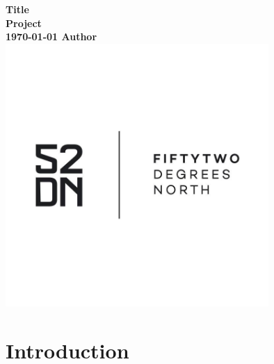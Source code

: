 \documentclass[a4paper,11pt]{article}
\title{\gettitle}
\date{\today}
\author{\getauthor}
\newcommand{\gettitle}{Title}
\newcommand{\getproject}{Project}
\newcommand{\getauthor}{Author}
\begin{document}
\begin{titlepage}
    \centering
    \vfill
    {\bfseries\Large
        \gettitle\\
        \getproject\\
        \today 
        \vskip2cm
        \getauthor\\
    }    
    \vfill
    \includegraphics[width=10cm]{52dn.jpg}
    \vfill
    \vfill
\end{titlepage}

\newpage

\tableofcontents

\newpage

\section{Introduction}


 
\end{document}
